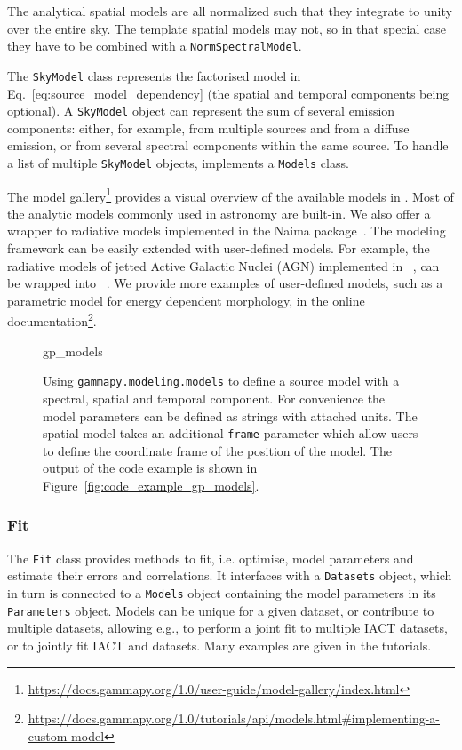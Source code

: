 \documentclass[longauth]{aa}
\newcommand{\code}[1]{\texttt{#1}}
\begin{document}
The analytical spatial models are all normalized such that they integrate to
unity over the entire sky. The template spatial models may not, so in that special
case they have to be combined with a \code{NormSpectralModel}.

The \code{SkyModel} class represents the factorised model in Eq.~\ref{eq:source_model_dependency}
(the spatial and temporal components being optional).
A \code{SkyModel} object can represent the sum of several emission components:
either, for example, from multiple sources and from a diffuse emission, or from several spectral
components within the same source. To handle a list of multiple \code{SkyModel} objects, \gammapy
implements a \code{Models} class.

The model gallery\footnote{\url{https://docs.gammapy.org/1.0/user-guide/model-gallery/index.html}}
 provides a visual overview of the available models in
\gammapy. Most of the analytic models commonly used in \gammaray astronomy are
built-in. We also offer a wrapper to radiative models implemented in the Naima
package~\citep{naima}. The modeling framework can be easily extended with
user-defined models. For example, the radiative models of jetted Active Galactic Nuclei (AGN)
implemented in \agnpy~\citep{agnpy2022}, can be wrapped into 
\gammapy~\citep[see Section 3.5 of ][]{2022A&A...660A..18N}. We provide 
more examples of user-defined models, such as a parametric model for energy dependent morphology,
in the online documentation\footnote{\url{https://docs.gammapy.org/1.0/tutorials/api/models.html\#implementing-a-custom-model}}.


\begin{figure}
	\small
	{gp_models}
	\caption{Using \code{gammapy.modeling.models} to define a source model with a
    spectral, spatial and temporal component. For convenience the model
    parameters can be defined as strings with attached units. The spatial model
    takes an additional \code{frame} parameter which allow users to define
    the coordinate frame of the position of the model. The output
	of the code example is shown in Figure~\ref{fig:code_example_gp_models}.
    }
	\label{fig*:minted:gp_models}
\end{figure}

\subsubsection{Fit}
\label{sssec:fit}


The \code{Fit} class provides methods to fit, i.e. optimise, model parameters and estimate
their errors and correlations. It interfaces with a \code{Datasets} object, which
in turn is connected to a \code{Models} object containing the model parameters in its
\code{Parameters} object. Models can be unique for a given dataset, or contribute to
multiple datasets, allowing e.g., to perform a joint fit to
multiple IACT datasets, or to jointly fit IACT and \fermi datasets. Many
examples are given in the tutorials.
\end{document}
